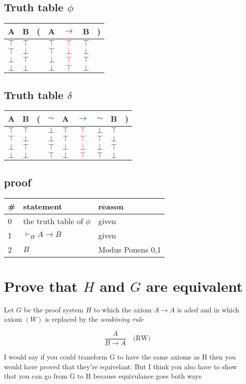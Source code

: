 \documentclass{article}
\begin{document}
\subsection{Truth table $\phi$}
\begin{tabular}{@{ }c@{ }@{ }c | c@{}@{ }c@{ }@{ }c@{ }@{ }c@{ }@{}c@{ }}
A & B & ( & A & $\rightarrow$ & B & )\\
\hline 
$\top$ & $\top$ &  & $\top$ & \textcolor{red}{$\top$} & $\top$ & \\
$\top$ & $\bot$ &  & $\top$ & \textcolor{red}{$\bot$} & $\bot$ & \\
$\bot$ & $\top$ &  & $\bot$ & \textcolor{red}{$\top$} & $\top$ & \\
$\bot$ & $\bot$ &  & $\bot$ & \textcolor{red}{$\top$} & $\bot$ & \\
\end{tabular}
\subsection{Truth table $\delta$}
\begin{tabular}{@{ }c@{ }@{ }c | c@{}@{ }c@{ }@{ }c@{ }@{ }c@{ }@{ }c@{ }@{ }c@{ }@{}c@{ }}
A & B & ( & $\sim$ & A & $\rightarrow$ & $\sim$ & B & )\\
\hline 
$\top$ & $\top$ &  & $\bot$ & $\top$ & \textcolor{red}{$\top$} & $\bot$ & $\top$ & \\
$\top$ & $\bot$ &  & $\bot$ & $\top$ & \textcolor{red}{$\top$} & $\top$ & $\bot$ & \\
$\bot$ & $\top$ &  & $\top$ & $\bot$ & \textcolor{red}{$\bot$} & $\bot$ & $\top$ & \\
$\bot$ & $\bot$ &  & $\top$ & $\bot$ & \textcolor{red}{$\top$} & $\top$ & $\bot$ & \\
\end{tabular}




\subsection{proof}

\begin{tabular}{@{}l|ll@{}}
\#& statement			&reason \\ \toprule
0& the truth table of $\phi$ & given \\
1& $\vdash_H A \to B$ & given \\
2& $B$ & Modus Ponens 0,1 \\
\end{tabular}

\section{Prove that $H$ and $G$ are equivalent}
Let $G$ be the proof system $H$ to which the axiom $A \to A$ 
is aded and in which axiom $(W)$ is replaced by the \emph{weakining rule}

\[\frac{A}{B \to A}\quad\text{(RW)} \]

I would say if you could transform G to have the same
axioms as H then you would have proved that they're equivelant. But I think
you also have to show that you can go from G to H because equivulance goes both
ways
\end{document}
